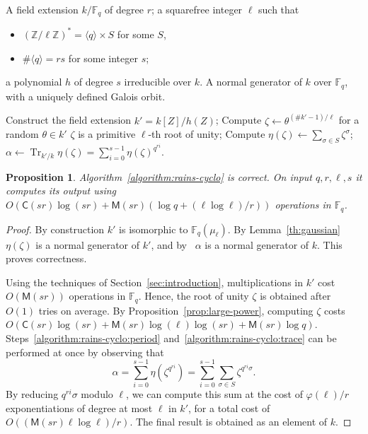 \documentclass[12pt]{article}
\theoremstyle{plain}
\newtheorem{proposition}[theorem]{Proposition}
\theoremstyle{definition}
\DeclareMathOperator{\trace}{Tr} %
\def\Z{\ensuremath{\mathbb{Z}}}
\def\F{\ensuremath{\mathbb{F}}}
\def\MM{\ensuremath{\mathsf{M}}}
\def\CC{\ensuremath{\mathsf{C}}}
\def\euler{\ensuremath{\varphi}}
\newcounter{algorithm}
\begin{document}
\begin{algorithm}
  \label{algorithm:rains-cyclo}
  \begin{algorithmic}[1]
    \REQUIRE A field extension $k/\F_q$ of degree $r$; a squarefree
    integer $\ell$ such that
    \begin{itemize}
    \item $(\Z/\ell\Z)^\ast = \langle q\rangle \times S$ for some $S$,
    \item $\#\langle q\rangle = rs$ for some integer $s$;
    \end{itemize}
    a polynomial $h$ of degree $s$ irreducible over $k$.
    \ENSURE A normal generator of $k$ over $\F_q$,
    with a uniquely defined Galois orbit.
    
    \STATE Construct the field extension $k'=k[Z]/h(Z)$;
    \REPEAT
    \STATE Compute $\zeta\leftarrow \theta^{(\#k'-1)/\ell}$ for a random $\theta\in k'$
    \UNTIL $\zeta$ is a primitive $\ell$-th root of unity;
    \STATE\label{algorithm:rains-cyclo:period} Compute $\eta(\zeta) \leftarrow \sum_{\sigma\in S}\zeta^\sigma$;
    \RETURN\label{algorithm:rains-cyclo:trace} $\alpha \leftarrow \trace_{k'/k}\eta(\zeta) = \sum_{i=0}^{s-1}\eta(\zeta)^{q^{ri}}$.
  \end{algorithmic}
\end{algorithm}

\begin{proposition}
  Algorithm~\ref{algorithm:rains-cyclo} is correct. On input
  $q,r,\ell,s$ it computes its output using
  $O(\CC(sr)\log(sr) + \MM(sr)(\log q + (\ell\log\ell)/r))$ operations in $\F_q$.
\end{proposition}
\begin{proof}
  By construction $k'$ is isomorphic to $\F_q(\mu_\ell)$. By
  Lemma~\ref{th:gaussian} $\eta(\zeta)$ is a normal generator of $k'$,
  and by~\cite[Prop.~5.2.3.1]{mullen2013handbook} $\alpha$ is a
  normal generator of $k$. This proves correctness.

  Using the techniques of Section~\ref{sec:introduction},
  multiplications in $k'$ cost $O(\MM(sr))$ operations in $\F_q$.
  Hence, the root of unity $\zeta$ is obtained after $O(1)$ tries on
  average. By Proposition~\ref{prop:large-power}, computing $\zeta$
  costs $O(\CC(sr)\log(sr)+\MM(sr)\log(\ell)\log(sr)+\MM(sr)\log q)$.
  Steps~\ref{algorithm:rains-cyclo:period}
  and~\ref{algorithm:rains-cyclo:trace} can be performed at once by
  observing that
  \[\alpha = \sum_{i=0}^{s-1}\eta(\zeta^{q^{ri}})= \sum_{i=0}^{s-1}\sum_{\sigma\in S}\zeta^{q^{ri}\sigma}.\]
  By reducing $q^{ri}\sigma$ modulo $\ell$, we can compute this sum at
  the cost of $\euler(\ell)/r$ exponentiations of degree at most
  $\ell$ in $k'$, for a total cost of
  $O((\MM(sr)\ell\log\ell)/r)$. The final result is obtained as an
  element of $k$.
\end{proof}
\end{document}
